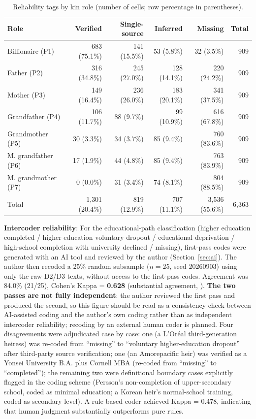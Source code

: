 \documentclass[11pt,a4paper]{article}
\begin{document}
\begin{table}[htbp]
\centering
\caption{Reliability tags by kin role (number of cells; row percentage in parentheses).}
\label{tab:reliability}
\small
\begin{tabular}{lrrrrr}
\toprule
Role & Verified & Single-source & Inferred & Missing & Total \\
\midrule
Billionaire (P1)   & 683 (75.1\%) & 141 (15.5\%) &  53 (5.8\%) &  32 (3.5\%) & 909 \\
Father (P2)        & 316 (34.8\%) & 245 (27.0\%) & 128 (14.1\%) & 220 (24.2\%) & 909 \\
Mother (P3)        & 149 (16.4\%) & 236 (26.0\%) & 183 (20.1\%) & 341 (37.5\%) & 909 \\
Grandfather (P4)   & 106 (11.7\%) &  88 (9.7\%)  &  99 (10.9\%) & 616 (67.8\%) & 909 \\
Grandmother (P5)   &  30 (3.3\%)  &  34 (3.7\%)  &  85 (9.4\%)  & 760 (83.6\%) & 909 \\
M. grandfather (P6) & 17 (1.9\%)  &  44 (4.8\%)  &  85 (9.4\%)  & 763 (83.9\%) & 909 \\
M. grandmother (P7) &  0 (0.0\%)  &  31 (3.4\%)  &  74 (8.1\%)  & 804 (88.5\%) & 909 \\
\midrule
Total             & 1{,}301 (20.4\%) & 819 (12.9\%) & 707 (11.1\%) & 3{,}536 (55.6\%) & 6{,}363 \\
\bottomrule
\end{tabular}
\end{table}

\textbf{Intercoder reliability}: For the educational-path classification (higher education completed / higher education voluntary dropout / educational deprivation / high-school completion with university declined / missing), first-pass codes were generated with an AI tool and reviewed by the author (Section~\ref{sec:ai}). The author then recoded a 25\% random subsample ($n=25$, seed 20260903) using only the raw D2/D3 texts, without access to the first-pass codes. Agreement was 84.0\% (21/25), Cohen's Kappa = \textbf{0.628} (substantial agreement, \citealp{landis1977}). \textbf{The two passes are not fully independent}: the author reviewed the first pass and produced the second, so this figure should be read as a consistency check between AI-assisted coding and the author's own coding rather than as independent intercoder reliability; recoding by an external human coder is planned. Four disagreements were adjudicated case by case: one (a L'Or\'eal third-generation heiress) was re-coded from ``missing'' to ``voluntary higher-education dropout'' after third-party source verification; one (an Amorepacific heir) was verified as a Yonsei University B.A. plus Cornell MBA (re-coded from ``missing'' to ``completed''); the remaining two were definitional boundary cases explicitly flagged in the coding scheme (Persson's non-completion of upper-secondary school, coded as minimal education; a Korean heir's normal-school training, coded as secondary level). A rule-based coder achieved Kappa = 0.478, indicating that human judgment substantially outperforms pure rules.
\end{document}
